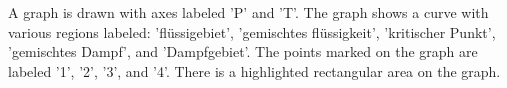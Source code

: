 A graph is drawn with axes labeled 'P' and 'T'. The graph shows a curve with various regions labeled: 'flüssigebiet', 'gemischtes flüssigkeit', 'kritischer Punkt', 'gemischtes Dampf', and 'Dampfgebiet'. The points marked on the graph are labeled '1', '2', '3', and '4'. There is a highlighted rectangular area on the graph.